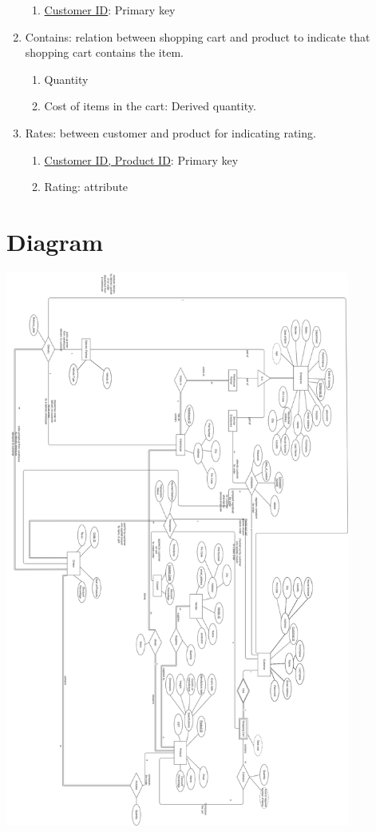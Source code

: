 \documentclass[12pt]{report}
\begin{document}
\begin{enumerate}
			\begin{enumerate}
				\item \underline{Customer ID}: Primary key
			\end{enumerate}
	\item Contains: relation between shopping cart and product to indicate that shopping cart contains the item.
		\begin{enumerate}
			\item Quantity
			\item Cost of items in the cart: Derived quantity.
		\end{enumerate}
	\item Rates: between customer and product for indicating rating.
		\begin{enumerate}
			\item \underline{Customer ID, Product ID}: Primary key
			\item Rating: attribute
		\end{enumerate}
	\end{enumerate}


	\section{Diagram}
	\includegraphics[width =0.85\textwidth]{Pictures/ER_Diagram.png}
\end{document}
